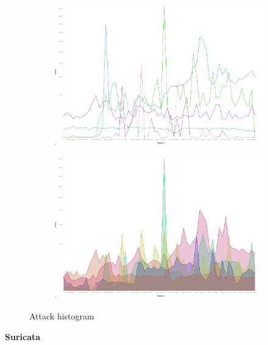 \begin{figure}
    \centering

    \begin{subfigure}[b]{0.49\textwidth}
        \centering
        \includegraphics[width=\textwidth]{figures/tpot-overview-histogram.png}
        \caption{}
        \label{fig:tpot-attack-histogram}
    \end{subfigure}
    \hfill
    \begin{subfigure}[b]{0.49\textwidth}
        \centering
        \includegraphics[width=\textwidth]{figures/tpot-attack-histogram.png}
        \caption{}
        \label{fig:tpot-overview-histogram}
    \end{subfigure}
    \caption[Attack histogram]{Attack histogram}
    \label{fig:attacks}
\end{figure}

\textbf{Suricata}

